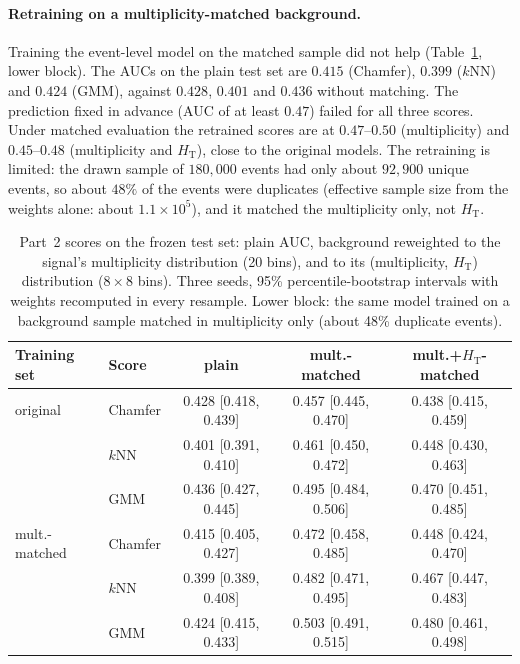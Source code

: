 \documentclass[11pt,a4paper]{article}
\newcommand{\HT}{\ensuremath{H_\mathrm{T}}\xspace}
\begin{document}
\paragraph{Retraining on a multiplicity-matched background.}
Training the event-level model on the matched sample did not help (Table~\ref{tab:matchp2}, lower block).
The AUCs on the plain test set are $0.415$ (Chamfer), $0.399$ ($k$NN) and $0.424$ (GMM),
against $0.428$, $0.401$ and $0.436$ without matching. The prediction fixed in advance (AUC of at
least $0.47$) failed for all three scores. Under matched evaluation the retrained scores are at
$0.47$--$0.50$ (multiplicity) and $0.45$--$0.48$ (multiplicity and \HT), close to the original
models. The retraining is limited: the drawn sample of $180{,}000$ events had only about $92{,}900$ unique events,
so about $48\%$ of the events were duplicates (effective sample size from the weights alone: about
$1.1\times10^{5}$), and it matched the multiplicity only, not \HT.

\begin{table}[t]
\centering
\caption{Part~2 scores on the frozen test set: plain AUC, background reweighted to the signal's
multiplicity distribution (20 bins), and to its (multiplicity, \HT) distribution ($8\times8$ bins).
Three seeds, 95\% percentile-bootstrap intervals with weights recomputed in every resample. Lower
block: the same model trained on a background sample matched in multiplicity only (about 48\% duplicate events).}
\label{tab:matchp2}
\footnotesize\setlength{\tabcolsep}{4pt}
\begin{tabular}{llccc}
\toprule
Training set & Score & plain & mult.-matched & mult.+\HT-matched \\
\midrule
original & Chamfer & 0.428 [0.418, 0.439] & 0.457 [0.445, 0.470] & 0.438 [0.415, 0.459] \\
         & $k$NN   & 0.401 [0.391, 0.410] & 0.461 [0.450, 0.472] & 0.448 [0.430, 0.463] \\
         & GMM     & 0.436 [0.427, 0.445] & 0.495 [0.484, 0.506] & 0.470 [0.451, 0.485] \\
\midrule
mult.-matched & Chamfer & 0.415 [0.405, 0.427] & 0.472 [0.458, 0.485] & 0.448 [0.424, 0.470] \\
              & $k$NN   & 0.399 [0.389, 0.408] & 0.482 [0.471, 0.495] & 0.467 [0.447, 0.483] \\
              & GMM     & 0.424 [0.415, 0.433] & 0.503 [0.491, 0.515] & 0.480 [0.461, 0.498] \\
\bottomrule
\end{tabular}
\end{table}
\end{document}
